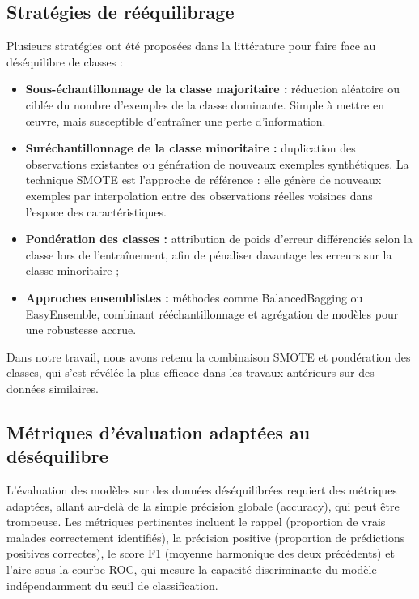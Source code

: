 \documentclass[12pt,a4paper]{report}
\begin{document}
\subsection{Stratégies de rééquilibrage}

Plusieurs stratégies ont été proposées dans la littérature pour faire face au
déséquilibre de classes \cite{he2009} :

\begin{itemize}
  \item \textbf{Sous-échantillonnage de la classe majoritaire :} réduction aléatoire
    ou ciblée du nombre d'exemples de la classe dominante. Simple à mettre en œuvre,
    mais susceptible d'entraîner une perte d'information.
  \item \textbf{Suréchantillonnage de la classe minoritaire :} duplication des
    observations existantes ou génération de nouveaux exemples synthétiques. La
    technique \acs{SMOTE} \cite{chawla2002} est l'approche de référence : elle génère
    de nouveaux exemples par interpolation entre des observations réelles voisines
    dans l'espace des caractéristiques.
  \item \textbf{Pondération des classes :} attribution de poids d'erreur différenciés
    selon la classe lors de l'entraînement, afin de pénaliser davantage les erreurs
    sur la classe minoritaire ;
  \item \textbf{Approches ensemblistes :} méthodes comme BalancedBagging ou
    EasyEnsemble, combinant rééchantillonnage et agrégation de modèles pour une
    robustesse accrue.
\end{itemize}

Dans notre travail, nous avons retenu la combinaison \acs{SMOTE} et pondération des
classes, qui s'est révélée la plus efficace dans les travaux antérieurs sur des
données similaires.

\subsection{Métriques d'évaluation adaptées au déséquilibre}

L'évaluation des modèles sur des données déséquilibrées requiert des métriques
adaptées, allant au-delà de la simple précision globale (accuracy), qui peut être
trompeuse. Les métriques pertinentes incluent le rappel (proportion de vrais malades
correctement identifiés), la précision positive (proportion de prédictions positives
correctes), le score F1 (moyenne harmonique des deux précédents) et l'aire sous la
courbe \acs{ROC}, qui mesure la capacité discriminante du modèle indépendamment du
seuil de classification.
\end{document}
